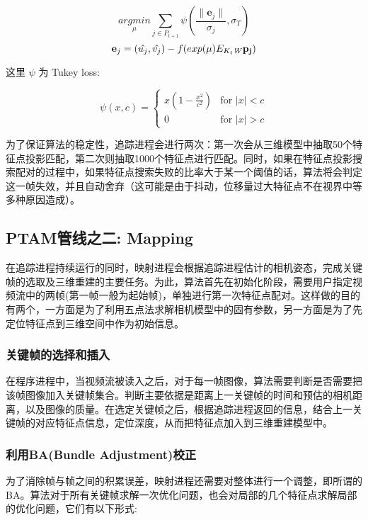 \begin{equation}
\label{eq:post_update}
\underset{\mu}{argmin} \sum_{j\in P_{t+1}} \psi( \frac{\lVert\mathbf{e}_j\rVert}{\sigma_j} , \sigma_T)
\end{equation}
\begin{equation}
\mathbf{e}_j= (\hat{u_j},\hat{v_j})- f(exp(\mu)E_{K_{t}\mathit{W}} \mathbf{p_j})
\end{equation}

这里 $\psi$ 为 Tukey loss:

\begin{equation}
\psi(x,c)= 
\begin{cases}
x(1-\frac{x^2}{c^2}) & \text{for }|x|<c \\
0  &  \text{for }|x|>c
\end{cases}
\end{equation}

为了保证算法的稳定性，追踪进程会进行两次：第一次会从三维模型中抽取50个特征点投影匹配，第二次则抽取1000个特征点进行匹配。同时，如果在特征点投影搜索配对的过程中，如果特征点搜索失败的比率大于某一个阈值的话，算法将会判定这一帧失效，并且自动舍弃（这可能是由于抖动，位移量过大特征点不在视界中等多种原因造成）。


\subsection{PTAM管线之二: Mapping}

在追踪进程持续运行的同时，映射进程会根据追踪进程估计的相机姿态，完成关键帧的选取及三维重建的主要任务。为此，算法首先在初始化阶段，需要用户指定视频流中的两帧(第一帧一般为起始帧)，单独进行第一次特征点配对。这样做的目的有两个，一方面是为了利用五点法求解相机模型中的固有参数，另一方面是为了先定位特征点到三维空间中作为初始信息。

\subsubsection{关键帧的选择和插入}
在程序进程中，当视频流被读入之后，对于每一帧图像，算法需要判断是否需要把该帧图像加入关键帧集合。判断主要依据是距离上一关键帧的时间和预估的相机距离，以及图像的质量。在选定关键帧之后，根据追踪进程返回的信息，结合上一关键帧的对应特征点信息，定位深度，从而把特征点加入到三维重建模型中。

\subsubsection{利用BA(Bundle Adjustment)校正}
为了消除帧与帧之间的积累误差，映射进程还需要对整体进行一个调整，即所谓的BA。算法对于所有关键帧求解一次优化问题，也会对局部的几个特征点求解局部的优化问题，它们有以下形式:

